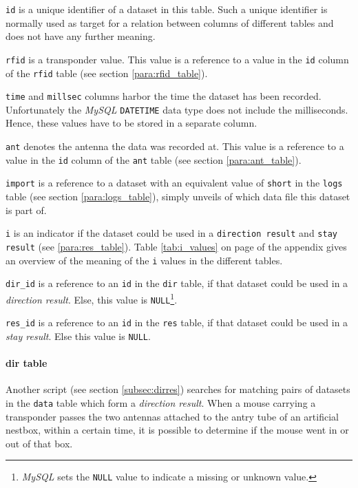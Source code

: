 \begin{mydesc}
  \item \lstinline|id| is a unique identifier of a dataset in this table. Such a unique identifier is normally used as target for a relation between columns of different tables and does not have any further meaning.
  \item \lstinline|rfid| is a transponder value. This value is a reference to a value in the \lstinline|id| column of the \lstinline|rfid| table (see section \ref{para:rfid_table}).
  \item \lstinline|time| and \lstinline|millsec| columns harbor the time the dataset has been recorded. Unfortunately the \textit{MySQL} \lstinline|DATETIME| data type does not include the milliseconds. Hence, these values have to be stored in a separate column.
  \item \lstinline|ant| denotes the antenna the data was recorded at. This value is a reference to a value in the \lstinline|id| column of the \lstinline|ant| table (see section \ref{para:ant_table}).
  \item \lstinline|import| is a reference to a dataset with an equivalent value of \lstinline|short| in the \lstinline|logs| table (see section \ref{para:logs_table}), simply unveils of which data file this dataset is part of.
  \item \lstinline|i| is an indicator if the dataset could be used in a \lstinline|direction result| and \lstinline|stay result| (see \ref{para:res_table}). Table \ref{tab:i_values} on page \pageref{tab:i_values} of the appendix gives an overview of the meaning of the \lstinline|i| values in the different tables.
  \item \lstinline|dir_id| is a reference to an \lstinline|id| in the \lstinline|dir| table, if that dataset could be used in a \textit{direction result}. Else, this value is \lstinline|NULL|\footnote{\textit{MySQL} sets the \lstinline|NULL| value to indicate a missing or unknown value.}.
  \item \lstinline|res_id| is a reference to an \lstinline|id| in the \lstinline|res| table, if that dataset could be used in a \textit{stay result}. Else this value is \lstinline|NULL|.
\end{mydesc}

\paragraph{dir table}
\label{para:dir_table}

Another script (see section \ref{subsec:dirres}) searches for matching pairs of datasets in the \lstinline|data| table which form a \textit{direction result}. When a mouse carrying a transponder passes the two antennas attached to the antry tube of an artificial nestbox, within a certain time, it is possible to determine if the mouse went in or out of that box. 

